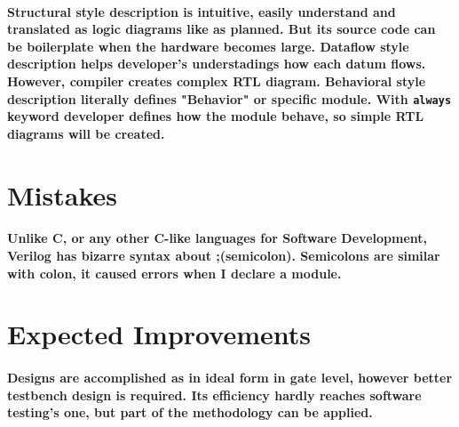 \documentclass{report}
\begin{document}
        \paragraph{\normalfont Structural style description is intuitive, easily understand and translated as logic diagrams like as planned. But its source code can be boilerplate when the hardware becomes large. Dataflow style description helps developer's understadings how each datum flows. However, compiler creates complex RTL diagram. Behavioral style description literally defines "Behavior" or specific module. With \texttt{always} keyword developer defines how the module behave, so simple RTL diagrams will be created.}

        \section{Mistakes}

        \paragraph{\normalfont Unlike C, or any other C-like languages for Software Development, Verilog has bizarre syntax about ;(semicolon). Semicolons are similar with colon, it caused errors when I declare a module.}

        \section{Expected Improvements}

        \paragraph{\normalfont Designs are accomplished as in ideal form in gate level, however better testbench design is required. Its efficiency hardly reaches software testing's one, but part of the methodology can be applied.}
\end{document}
